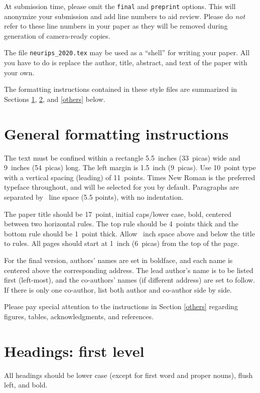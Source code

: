\documentclass{article}
\begin{document}
At submission time, please omit the \verb+final+ and \verb+preprint+
options. This will anonymize your submission and add line numbers to aid
review. Please do \emph{not} refer to these line numbers in your paper as they
will be removed during generation of camera-ready copies.

The file \verb+neurips_2020.tex+ may be used as a ``shell'' for writing your
paper. All you have to do is replace the author, title, abstract, and text of
the paper with your own.

The formatting instructions contained in these style files are summarized in
Sections \ref{gen_inst}, \ref{headings}, and \ref{others} below.

\section{General formatting instructions}
\label{gen_inst}

The text must be confined within a rectangle 5.5~inches (33~picas) wide and
9~inches (54~picas) long. The left margin is 1.5~inch (9~picas).  Use 10~point
type with a vertical spacing (leading) of 11~points.  Times New Roman is the
preferred typeface throughout, and will be selected for you by default.
Paragraphs are separated by ~line space (5.5 points), with no
indentation.

The paper title should be 17~point, initial caps/lower case, bold, centered
between two horizontal rules. The top rule should be 4~points thick and the
bottom rule should be 1~point thick. Allow ~inch space above and
below the title to rules. All pages should start at 1~inch (6~picas) from the
top of the page.

For the final version, authors' names are set in boldface, and each name is
centered above the corresponding address. The lead author's name is to be listed
first (left-most), and the co-authors' names (if different address) are set to
follow. If there is only one co-author, list both author and co-author side by
side.

Please pay special attention to the instructions in Section \ref{others}
regarding figures, tables, acknowledgments, and references.

\section{Headings: first level}
\label{headings}

All headings should be lower case (except for first word and proper nouns),
flush left, and bold.
\end{document}
